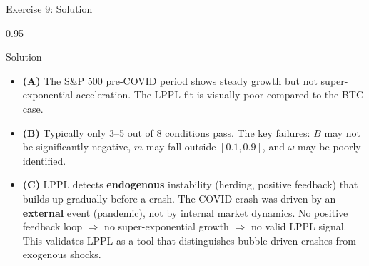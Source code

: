 \documentclass[9pt, aspectratio=169, t]{beamer}
\begin{document}
\begin{frame}{Exercise 9: Solution}
    \begin{cminipage}{0.95\textwidth}
    \begin{exampleblock}{Solution}
        {\small
        \begin{itemize}\setlength{\itemsep}{3pt}
            \item \textcolor{MainBlue}{\textbf{(A)}} The S\&P 500 pre-COVID period shows steady growth but not super-exponential acceleration. The LPPL fit is visually poor compared to the BTC case.
            \item \textcolor{MainBlue}{\textbf{(B)}} Typically only 3--5 out of 8 conditions pass. The key failures: $B$ may not be significantly negative, $m$ may fall outside $[0.1, 0.9]$, and $\omega$ may be poorly identified.
            \item \textcolor{MainBlue}{\textbf{(C)}} LPPL detects \textbf{endogenous} instability (herding, positive feedback) that builds up gradually before a crash. The COVID crash was driven by an \textbf{external} event (pandemic), not by internal market dynamics. No positive feedback loop $\Rightarrow$ no super-exponential growth $\Rightarrow$ no valid LPPL signal. This validates LPPL as a tool that distinguishes bubble-driven crashes from exogenous shocks.
        \end{itemize}
        }
    \end{exampleblock}
    \end{cminipage}
\end{frame}
\end{document}
